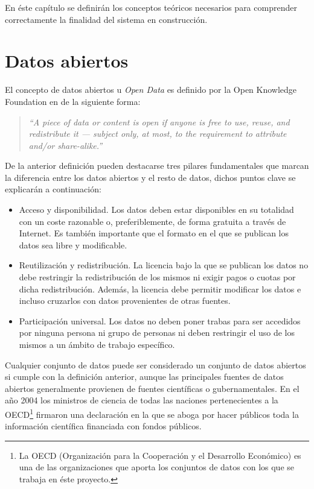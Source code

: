 En éste capítulo se definirán los conceptos teóricos necesarios para comprender correctamente la finalidad del sistema en construcción.

\section{Datos abiertos}
El concepto de datos abiertos u \textit{Open Data} es definido por la Open Knowledge Foundation en \cite{opendefinition} de la siguiente forma:
\begin{quote}
\textit{``A piece of data or content is open if anyone is free to use, reuse, and redistribute it — subject only, at most, to the requirement to attribute and/or share-alike.''}
\end{quote}

De la anterior definición pueden destacarse tres pilares fundamentales que marcan la diferencia entre los datos abiertos y el resto de datos, dichos puntos clave se explicarán a continuación:
\begin{itemize}
\item Acceso y disponibilidad. Los datos deben estar disponibles en su totalidad con un coste razonable o, preferiblemente, de forma gratuita a través de Internet.  Es también importante que el formato en el que se publican los datos sea libre y modificable.
\item Reutilización y redistribución.  La licencia bajo la que se publican los datos no debe restringir la redistribución de los mismos ni exigir pagos o cuotas por dicha redistribución.  Además, la licencia debe permitir modificar los datos e incluso cruzarlos con datos provenientes de otras fuentes.
\item Participación universal.  Los datos no deben poner trabas para ser accedidos por ninguna persona ni grupo de personas ni deben restringir el uso de los mismos a un ámbito de trabajo específico.
\end{itemize}

Cualquier conjunto de datos puede ser considerado un conjunto de datos abiertos si cumple con la definición anterior, aunque las principales fuentes de datos abiertos generalmente provienen de fuentes científicas o gubernamentales.  En el año 2004 los ministros de ciencia de todas las naciones pertenecientes a la OECD\footnote{La OECD (Organización para la Cooperación y el Desarrollo Económico) es una de las organizaciones que aporta los conjuntos de datos con los que se trabaja en éste proyecto.} firmaron una declaración en la que se aboga por hacer públicos toda la información científica financiada con fondos públicos.

